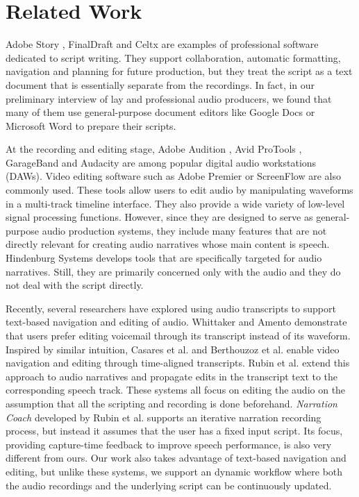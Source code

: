 \section{Related Work}

Adobe Story \cite{adobestory2016}, FinalDraft \cite{finaldraft2016} and Celtx \cite{celtx2016} are examples of professional software dedicated to script writing. They support collaboration, automatic formatting, navigation and planning for future production, but they treat the script as a text document that is essentially separate from the recordings. In fact, in our preliminary interview of lay and professional audio producers, we found that many of them use general-purpose document editors like Google Docs \cite{googledocs2016} or Microsoft Word \cite{microsoftword2016} to prepare their scripts.

At the recording and editing stage, Adobe Audition \cite{adobeaudition2016}, Avid ProTools \cite{avidprotools}, GarageBand \cite{garageband} and Audacity \cite{audacity} are among popular digital audio workstations (DAWs). Video editing software such as Adobe Premier \cite{} or ScreenFlow \cite{screenflow} are also commonly used. These tools allow users to edit audio by manipulating waveforms in a multi-track timeline interface. They also provide a wide variety of low-level signal processing functions. However, since they are designed to serve as general-purpose audio production systems, they include many features that are not directly relevant for creating audio narratives whose main content is speech. Hindenburg Systems \cite{hindenburg} develops tools that are specifically targeted for audio narratives. Still, they are primarily concerned only with the audio and they do not deal with the script directly.   

Recently, several researchers have explored using audio transcripts to support text-based navigation and editing of audio. Whittaker and Amento \cite{whittaker2004semantic} demonstrate that users prefer editing voicemail through its transcript instead of its waveform. Inspired by similar intuition, Casares et al. \cite{casares2002simplifying} and Berthouzoz et al. \cite{berthouzoz2012tools} enable video navigation and editing through time-aligned transcripts. Rubin et al. \cite{rubin2013content} extend this approach to audio narratives and propagate edits in the transcript text to the corresponding speech track. These systems all focus on editing the audio on the assumption that all the scripting and recording is done beforehand. \textit{Narration Coach} developed by Rubin et al. 
supports an iterative narration recording process, but instead it assumes that the user has a fixed input script. Its focus, providing capture-time feedback to improve speech performance, is also very different from ours. Our work also takes advantage of text-based navigation and editing, but unlike these systems, we support an dynamic workflow where both the audio recordings and the underlying script can be continuously  updated.      